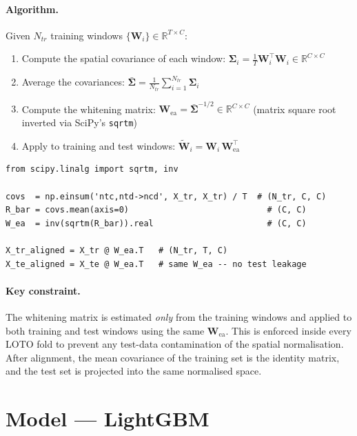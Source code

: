\documentclass[12pt,a4paper]{article}
\begin{document}
\paragraph{Algorithm.} Given $N_{tr}$ training windows
$\{\mathbf{W}_i\} \in \mathbb{R}^{T \times C}$:

\begin{enumerate}[leftmargin=1.5em]
  \item Compute the spatial covariance of each window:
        $\boldsymbol{\Sigma}_i = \frac{1}{T}\mathbf{W}_i^\top\mathbf{W}_i \in \mathbb{R}^{C \times C}$
  \item Average the covariances:
        $\bar{\boldsymbol{\Sigma}} = \frac{1}{N_{tr}}\sum_{i=1}^{N_{tr}} \boldsymbol{\Sigma}_i$
  \item Compute the whitening matrix:
        $\mathbf{W}_{\text{ea}} = \bar{\boldsymbol{\Sigma}}^{-1/2} \in \mathbb{R}^{C \times C}$
        (matrix square root inverted via SciPy's \texttt{sqrtm})
  \item Apply to training and test windows:
        $\tilde{\mathbf{W}}_i = \mathbf{W}_i\,\mathbf{W}_{\text{ea}}^\top$
\end{enumerate}

\begin{lstlisting}[style=pycode]
from scipy.linalg import sqrtm, inv

covs  = np.einsum('ntc,ntd->ncd', X_tr, X_tr) / T  # (N_tr, C, C)
R_bar = covs.mean(axis=0)                            # (C, C)
W_ea  = inv(sqrtm(R_bar)).real                       # (C, C)

X_tr_aligned = X_tr @ W_ea.T   # (N_tr, T, C)
X_te_aligned = X_te @ W_ea.T   # same W_ea -- no test leakage
\end{lstlisting}

\paragraph{Key constraint.} The whitening matrix is estimated \emph{only}
from the training windows and applied to both training and test windows using
the same $\mathbf{W}_{\text{ea}}$. This is enforced inside every LOTO fold
to prevent any test-data contamination of the spatial normalisation. After
alignment, the mean covariance of the training set is the identity matrix,
and the test set is projected into the same normalised space.

\section{Model — LightGBM}
\end{document}
